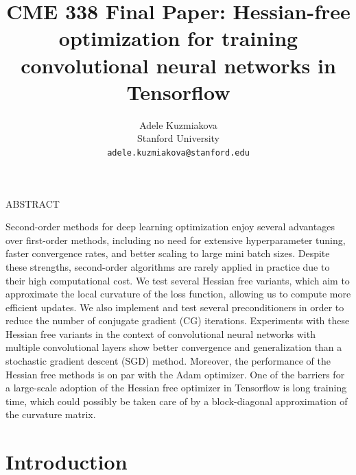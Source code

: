 \documentclass[10pt,twocolumn,letterpaper]{article}
\begin{document}
\title{CME 338 Final Paper: Hessian-free optimization for training convolutional neural networks in Tensorflow}

\author{Adele Kuzmiakova\\
Stanford University\\
{\tt\small adele.kuzmiakova@stanford.edu}
}
\maketitle

ABSTRACT

Second-order methods for deep learning optimization enjoy several advantages over first-order methods, including no need for extensive hyperparameter tuning, faster convergence rates, and better scaling to large mini batch sizes. Despite these strengths, second-order algorithms are rarely applied in practice due to their high computational cost. We test several Hessian free variants, which aim to approximate the local curvature of the loss function, allowing us to compute more efficient updates. We also implement and test several preconditioners in order to reduce the number of conjugate gradient (CG) iterations. Experiments with these Hessian free variants in the context of convolutional neural networks with multiple convolutional layers show better convergence and generalization than a stochastic gradient descent (SGD) method. Moreover, the performance of the Hessian free methods is on par with the Adam optimizer. One of the barriers for a large-scale adoption of the Hessian free optimizer in Tensorflow is long training time, which could possibly be taken care of by a block-diagonal approximation of the curvature matrix.

\section{Introduction}
\label{sec:introduction}
\end{document}
